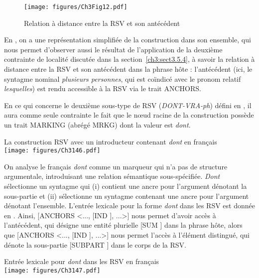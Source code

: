 \begin{figure}[b]
\texttt{[image: figures/Ch3Fig12.pdf]}  
\caption{Relation à distance entre la RSV et son antécédent}
\label{ch3:fig12}
\end{figure}

En , on a une représentation simplifiée de la construction dans son ensemble, qui nous permet d’observer aussi le résultat de l’application de la deu\-xième contrainte de localité discutée dans la section~\ref{ch3:sect3.5.4}, à savoir la relation à distance entre la RSV et son antécédent dans la phrase hôte : l’antécédent (ici, le syntagme nominal \textit{plusieurs personnes}, qui est coïndicé avec le pronom relatif \textit{lesquelles}) est rendu accessible à la RSV via le trait ANCHORS. 



En ce qui concerne le deuxième sous-type de RSV (\textit{DONT-VRA-ph}) défini en , il aura comme seule contrainte le fait que le nœud racine de la construction possède un trait MARKING (abrégé MRKG) dont la valeur est \textit{dont}.

  
\ea \label{ch3:ex146}
La construction RSV avec un introducteur contenant \textit{dont} en français\\
\texttt{[image: figures/Ch3146.pdf]}


\z

On analyse le français \textit{dont} comme un marqueur qui n’a pas de structure argumentale, introduisant une relation sémantique sous-spécifiée. \textit{Dont} sélectionne un syntagme qui (i) contient une ancre pour l’argument dénotant la sous-partie et (ii) sélectionne un syntagme contenant une ancre pour l’argument dénotant l’ensemble. L’entrée lexicale pour la forme \textit{dont} dans les RSV est donnée en . Ainsi, [ANCHORS <..., [IND ], ...>] nous permet d’avoir accès à l’antécédent, qui désigne une entité plurielle [SUM ] dans la phrase hôte, alors que [ANCHORS <..., [IND ], ...>] nous permet l’accès à l’élément distingué, qui dénote la sous-partie [SUBPART ] dans le corps de la RSV. 

\ea \label{ch3:ex147}
Entrée lexicale pour \textit{dont} dans les RSV en français\\
\texttt{[image: figures/Ch3147.pdf]}

